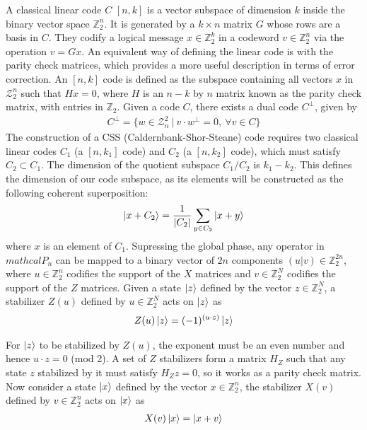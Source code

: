 \documentclass[12pt, twoside, openany]{book}
\begin{document}
A classical linear code $C$ $[n,k]$ is a vector subspace of dimension $k$ inside the binary vector space $\mathbb{Z}^n_2$. It is generated by a $k \times  n$ matrix $G$ whose rows are a basis in $C$. They codify a logical message $x \in \mathbb{Z}^k_2$ in a codeword $v \in \mathbb{Z}^n_2$ via the operation $v = G x$. An equivalent way of defining the linear code is with the parity check matrices, which provides a more useful description in terms of error correction. An $[n,k]$ code is defined as the subspace containing all vectors $x$ in $\mathcal{Z}^n_2$ such that $Hx = 0$, where $H$ is an $n-k$ by $n$ matrix known as the parity check matrix, with entries in $\mathbb{Z}_2$. Given a code $C$, there exists a dual code $C^\perp$, given by
\begin{align*}
    C^\perp = \{w \in \mathcal{Z}^2_n \ | \ v \cdot w^\perp =0, \ \forall v \in C\}
\end{align*}
The construction of a CSS (Caldernbank-Shor-Steane) code \cite{steane1996} requires two classical linear codes $C_1$ (a $[n, k_1]$ code) and $C_2$ (a $[n, k_2]$ code), which must satisfy $C_2 \subset C_1$. The dimension of the quotient subspace $C_1 / C_2$ is $k_1 - k_2$. This defines the dimension of our code subspace, as its elements will be constructed as the following coherent superposition:
\begin{align}
    \ket{x + C_2} = \frac{1}{|C_2|} \sum_{y \in C_2} \ket{x + y}
\end{align}
where $x$ is an element of $C_1$. Supressing the global phase, any operator in $mathcal{P}_n$ can be mapped to a binary vector of $2n$ components $(u|v) \in \mathbb{Z}^{2n}_2$, where $u \in \mathbb{Z}^n_2$ codifies the support of the $X$ matrices and $v \in \mathbb{Z}^N_2$ codifies the support of the $Z$ matrices. Given a state $\ket{z}$ defined by the vector $z \in \mathbb{Z}^N_2$, a stabilizer $Z(u)$ defined by $u \in \mathbb{Z}^N_2$ acts on $\ket{z}$ as
\begin{align*}
    Z(u) \ket{z} = (-1)^{(u \cdot z)} \ket{z}
\end{align*}

For $\ket{z}$ to be stabilized by $Z(u)$, the exponent must be an even number and hence $u \cdot z = 0$ (mod 2). A set of $Z$ stabilizers form a matrix $H_Z$ such that any state $z$ stabilized by it must satisfy $H_Z z = 0$, so it works as a parity check matrix. Now consider a state $\ket{x}$ defined by the vector $x \in \mathbb{Z}^n_2$, the stabilizer $X(v)$ defined by $v \in \mathbb{Z}^n_2$ acts on $\ket{x}$ as
\begin{align*}
    X(v) \ket{x} = \ket{x + v} 
\end{align*}
\end{document}
